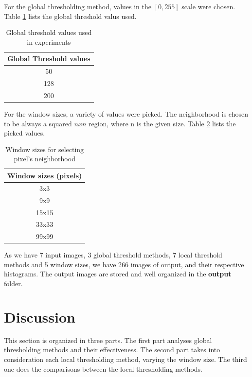 \documentclass[]{IEEEtran}
\begin{document}
For the global thresholding method, values in the $[0,255]$ scale were chosen. Table \ref{table:globalth} lists the global threshold valus used.

\begin{table}[h!]
  \centering
  \begin{center}
  \begin{tabular}{ |c| } 
   \hline
   Global Threshold values \\
   \hline
      50\\ 
   \hline
      128\\
   \hline
      200\\
    \hline
  \end{tabular}
  \caption{Global threshold values used in experiments}
  \label{table:globalth}
  \end{center}
  \end{table}

For the window sizes, a variety of values were picked. The neighborhood is chosen to be always a squared $nxn$ region, where n is the given size.
Table \ref{table:windows} lists the picked values.

\begin{table}[h!]
  \centering
  \begin{center}
  \begin{tabular}{ |c| } 
   \hline
   Window sizes (pixels)\\
   \hline
      3x3\\ 
   \hline
      9x9\\
   \hline
      15x15\\
    \hline
    33x33\\
    \hline
    99x99\\
    \hline
  \end{tabular}
  \caption{Window sizes for selecting pixel's neighborhood}
  \label{table:windows}
  \end{center}
  \end{table}

As we have 7 input images, 3 global threshold methods, 7 local threshold methods and 5 window sizes, we have 266 images of output, and their respective histograms. The output images are stored and well organized in the \textbf{output} folder.

\section{Discussion}
This section is organized in three parts. The first part analyses global thresholding methods and their effectiveness. The second part takes into consideration each local thresholding method, varying the window size. The third one does the comparisons between the local thresholding methods.
\end{document}
